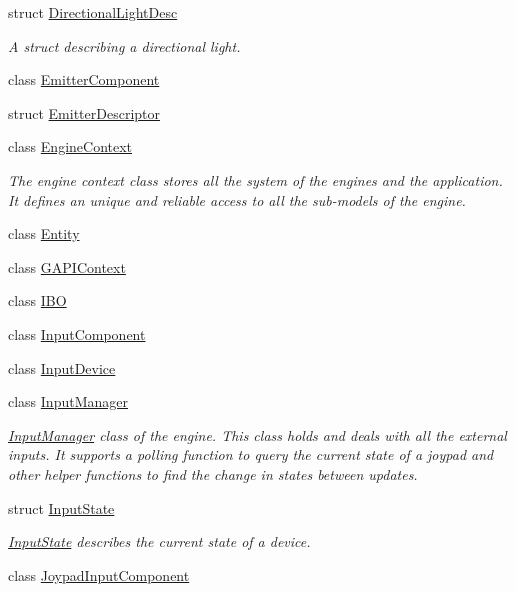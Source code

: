 \begin{DoxyCompactItemize}
struct \hyperlink{struct_blade_1_1_directional_light_desc}{Directional\+Light\+Desc}
\begin{DoxyCompactList}\small\item\em A struct describing a directional light. \end{DoxyCompactList}\item 
class \hyperlink{class_blade_1_1_emitter_component}{Emitter\+Component}
\item 
struct \hyperlink{struct_blade_1_1_emitter_descriptor}{Emitter\+Descriptor}
\item 
class \hyperlink{class_blade_1_1_engine_context}{Engine\+Context}
\begin{DoxyCompactList}\small\item\em The engine context class stores all the system of the engines and the application. It defines an unique and reliable access to all the sub-\/models of the engine. \end{DoxyCompactList}\item 
class \hyperlink{class_blade_1_1_entity}{Entity}
\item 
class \hyperlink{class_blade_1_1_g_a_p_i_context}{G\+A\+P\+I\+Context}
\item 
class \hyperlink{class_blade_1_1_i_b_o}{I\+BO}
\item 
class \hyperlink{class_blade_1_1_input_component}{Input\+Component}
\item 
class \hyperlink{class_blade_1_1_input_device}{Input\+Device}
\item 
class \hyperlink{class_blade_1_1_input_manager}{Input\+Manager}
\begin{DoxyCompactList}\small\item\em \hyperlink{class_blade_1_1_input_manager}{Input\+Manager} class of the engine. This class holds and deals with all the external inputs. It supports a polling function to query the current state of a joypad and other helper functions to find the change in states between updates. \end{DoxyCompactList}\item 
struct \hyperlink{struct_blade_1_1_input_state}{Input\+State}
\begin{DoxyCompactList}\small\item\em \hyperlink{struct_blade_1_1_input_state}{Input\+State} describes the current state of a device. \end{DoxyCompactList}\item 
class \hyperlink{class_blade_1_1_joypad_input_component}{Joypad\+Input\+Component}

\end{DoxyCompactItemize}
